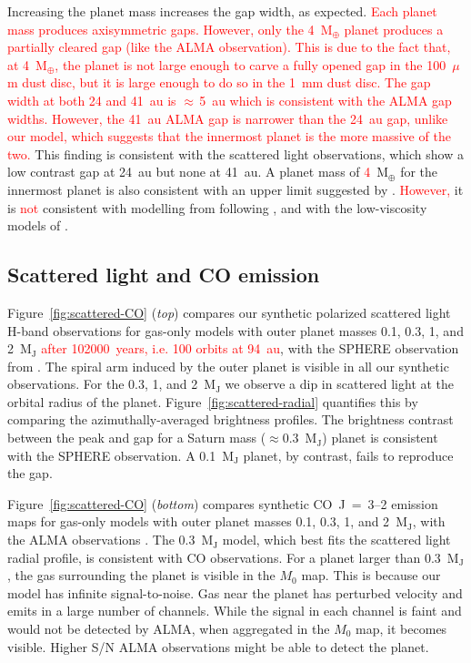 \documentclass[usenatbib,a4paper,times]{mnras}
\renewcommand{\earth}{\mathrm{M}_{\oplus}}
\newcommand{\new}[1]{{\textcolor{red}{#1}}}
\begin{document}
Increasing the planet mass increases the gap width, as expected. \new{Each
planet mass produces axisymmetric gaps. However, only the 4~$\earth{}$ planet
produces a partially cleared gap (like the ALMA observation). This is due to the
fact that, at 4~$\earth{}$, the planet is not large enough to carve a fully
opened gap in the 100~$\mu$m dust disc, but it is large enough to do so in the
1~mm dust disc. The gap width at both 24 and 41~au is $\approx\,$5~au which is
consistent with the ALMA gap widths. However, the 41~au ALMA gap is narrower
than the 24~au gap, unlike our model, which suggests that the innermost planet
is the more massive of the two.} This finding is consistent with the scattered
light observations, which show a low contrast gap at 24~au but none at 41~au. A
planet mass of \new{4}~$\earth{}$ for the innermost planet is also consistent
with an upper limit suggested by \citet{nomura:2016}. \new{However,} it is
\new{not} consistent with modelling from \citet{van-boekel:2017} following
\citet{duffell:2015}, and with the low-viscosity models of \citet{dong:2017b}.





\subsection{Scattered light and CO emission}

Figure~\ref{fig:scattered-CO} (\textit{top}) compares our synthetic polarized
scattered light H-band observations for gas-only models with outer planet masses
0.1, 0.3, 1, and 2~$\mathrm{M_J}$ \new{after 102000~years, i.e. 100 orbits at
94~au}, with the SPHERE observation from \citet{van-boekel:2017}. The spiral arm
induced by the outer planet is visible in all our synthetic observations. For
the 0.3, 1, and 2~$\mathrm{M_J}$ we observe a dip in scattered light at the
orbital radius of the planet. Figure~\ref{fig:scattered-radial} quantifies this
by comparing the azimuthally-averaged brightness profiles. The brightness
contrast between the peak and gap for a Saturn mass
($\approx$0.3~$\mathrm{M_J}$) planet is consistent with the SPHERE observation.
A 0.1~$\mathrm{M_J}$ planet, by contrast, fails to reproduce the gap.

Figure~\ref{fig:scattered-CO} (\textit{bottom}) compares synthetic CO~J~=~3--2
emission maps for gas-only models with outer planet masses 0.1, 0.3, 1, and
2~$\mathrm{M_J}$, with the ALMA observations \citep{huang:2018}. The
0.3~$\mathrm{M_J}$ model, which best fits the scattered light radial profile, is
consistent with CO observations. For a planet larger than 0.3~$\mathrm{M_J}$,
the gas surrounding the planet is visible in the $M_0$ map. This is because our
model has infinite signal-to-noise. Gas near the planet has perturbed velocity
and emits in a large number of channels. While the signal in each channel is
faint and would not be detected by ALMA, when aggregated in the $M_0$ map, it
becomes visible. Higher S/N ALMA observations might be able to detect the
planet.
\end{document}
